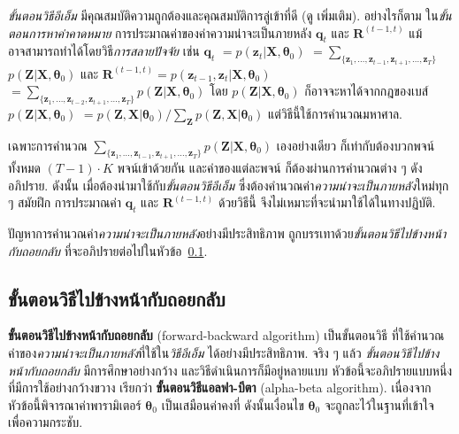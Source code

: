 \textit{ขั้นตอนวิธีอีเอ็ม} มีคุณสมบัติความถูกต้องและคุณสมบัติการลู่เข้าที่ดี (ดู \cite{SpringerUrban2014} เพิ่มเติม).
อย่างไรก็ตาม 
ใน\textit{ขั้นตอนการหาค่าคาดหมาย}
การประมาณค่าของค่าความน่าจะเป็นภายหลัง $\bm{q}_t$ และ $\bm{R}^{(t-1,t)}$ 
แม้อาจสามารถทำได้โดยวิธี\textit{การสลายปัจจัย} เช่น
$\bm{q}_t$ 
$= p(\bm{z}_t|\bm{X}, \bm{\theta}_0)$
$= \sum_{ \{\bm{z}_1, \ldots, \bm{z}_{t-1}, \bm{z}_{t+1}, \ldots, \bm{z}_T \} }$ 
$p(\bm{Z}|\bm{X}, \bm{\theta}_0)$
และ
$\bm{R}^{(t-1, t)} = p(\bm{z}_{t-1}, \bm{z}_t|\bm{X}, \bm{\theta}_0)$
$= \sum_{ \{\bm{z}_1, \ldots, \bm{z}_{t-2}, \bm{z}_{t+1}, \ldots, \bm{z}_T \} } p(\bm{Z}|\bm{X}, \bm{\theta}_0)$
โดย $p(\bm{Z}|\bm{X}, \bm{\theta}_0)$ ก็อาจจะหาได้จากกฎของเบส์
$p(\bm{Z}|\bm{X}, \bm{\theta}_0)$ 
$= p(\bm{Z},\bm{X}| \bm{\theta}_0) / \sum_{\bm{Z}} p(\bm{Z},\bm{X}| \bm{\theta}_0)$
แต่วิธีนี้ใช้การคำนวณมหาศาล.

เฉพาะการคำนวณ $\sum_{ \{\bm{z}_1, \ldots, \bm{z}_{t-1}, \bm{z}_{t+1}, \ldots, \bm{z}_T \} } p(\bm{Z}|\bm{X}, \bm{\theta}_0)$ เองอย่างเดียว ก็เท่ากับต้องบวกพจน์ทั้งหมด $(T-1) \cdot K$ พจน์เข้าด้วยกัน และค่าของแต่ละพจน์ ก็ต้องผ่านการคำนวณต่าง ๆ ดังอภิปราย.
ดังนั้น เมื่อต้องนำมาใช้กับ\textit{ขั้นตอนวิธีอีเอ็ม} ซึ่งต้องคำนวณค่า\textit{ความน่าจะเป็นภายหลัง}ใหม่ทุก ๆ สมัยฝึก
การประมาณค่า $\bm{q}_t$ และ $\bm{R}^{(t-1,t)}$  ด้วยวิธีนี้
จึงไม่เหมาะที่จะนำมาใช้ได้ในทางปฏิบัติ.

ปัญหาการคำนวณค่า\textit{ความน่าจะเป็นภายหลัง}อย่างมีประสิทธิภาพ
ถูกบรรเทาด้วย\textit{ขั้นตอนวิธีไปข้างหน้ากับถอยกลับ} ที่จะอภิปรายต่อไปในหัวข้อ~\ref{sec: seq HMM forward-backward}.

\subsection{ขั้นตอนวิธีไปข้างหน้ากับถอยกลับ}
\label{sec: seq HMM forward-backward}

\textbf{ขั้นตอนวิธีไปข้างหน้ากับถอยกลับ} (forward-backward algorithm)
เป็นขั้นตอนวิธี ที่ใช้คำนวณค่าของ\textit{ความน่าจะเป็นภายหลัง}ที่ใช้ใน\textit{วิธีอีเอ็ม} ได้อย่างมีประสิทธิภาพ.
จริง ๆ แล้ว \textit{ขั้นตอนวิธีไปข้างหน้ากับถอยกลับ} มีการศึกษาอย่างกว้าง และวิธีดำเนินการก็มีอยู่หลายแบบ
หัวข้อนี้จะอภิปรายแบบหนึ่งที่มีการใช้อย่างกว้างขวาง\cite{Bishop2006a} เรียกว่า \textbf{ขั้นตอนวิธีแอลฟา-บีตา} (alpha-beta algorithm).
เนื่องจาก หัวข้อนี้พิจารณาค่าพารามิเตอร์ $\bm{\theta}_0$ เป็นเสมือนค่าคงที่
ดังนั้นเงื่อนไข $\bm{\theta}_0$ จะถูกละไว้ในฐานที่เข้าใจ เพื่อความกระชับ. 

